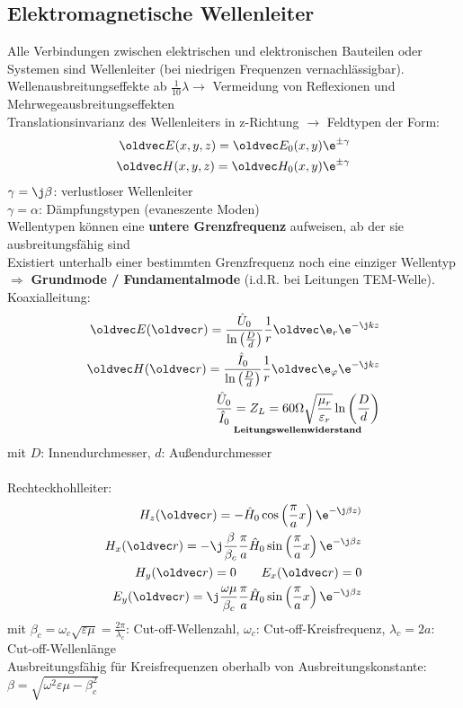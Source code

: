 \documentclass[6pt,a4paper]{scrartcl}
\let\vec\oldvec
\begin{document}
\begin{multicols}{4}
		\subsection{Elektromagnetische Wellenleiter}
	Alle Verbindungen zwischen elektrischen und elektronischen Bauteilen oder Systemen sind Wellenleiter (bei niedrigen Frequenzen vernachlässigbar).\\
	Wellenausbreitungseffekte ab $\frac{1}{10}\lambda \rightarrow$ Vermeidung von Reflexionen und Mehrwegeausbreitungseffekten\\
	Translationsinvarianz des Wellenleiters in z-Richtung $\rightarrow$ Feldtypen der Form:
	\begin{align*}
	 \vec E(x,y,z) = \vec E_0(x,y)\e^{\pm\gamma}\\
	 \vec H(x,y,z) = \vec H_0(x,y)\e^{\pm\gamma}
\end{align*}
	$\gamma = \j\beta$: verlustloser Wellenleiter\\
	$\gamma = \alpha$: Dämpfungstypen (evaneszente Moden)\\
	Wellentypen können eine \textbf{untere Grenzfrequenz} aufweisen, ab der sie ausbreitungsfähig sind\\
	Existiert unterhalb einer bestimmten Grenzfrequenz noch eine einziger Wellentyp $\Rightarrow$ \textbf{Grundmode / Fundamentalmode} (i.d.R. bei Leitungen TEM-Welle).\\
	Koaxialleitung:
	\begin{align*}
	\vec E(\vec r) = \frac{\hat U_0}{\ln\left(\frac{D}{d}\right)}\frac{1}{r}\vec\e_r\e^{-\j kz}\\
	\vec H(\vec r) = \frac{\hat I_0}{\ln\left(\frac{D}{d}\right)}\frac{1}{r}\vec\e_\varphi\e^{-\j kz}\\
	\underset{\textbf{Leitungswellenwiderstand}}{\frac{\hat U_0}{\hat I_0} = Z_L = 60\Omega\sqrt{\frac{\mu_r}{\varepsilon_r}}\ln\left(\frac{D}{d}\right)}
	\end{align*}
	mit $D$: Innendurchmesser, $d$: Außendurchmesser\\ \\
	
	Rechteckhohlleiter:
	\begin{align*}
	H_z(\vec r) = -\hat H_0\cos\left(\frac{\pi}{a}x\right)\e^{-\j\beta z)}\\
	H_x(\vec r) = -\j \frac{\beta}{\beta_c}\frac{\pi}{a}\hat H_0\sin\left(\frac{\pi}{a}x\right)\e^{-\j\beta z}\\
	H_y(\vec r) = 0\qquad E_x(\vec r) = 0\\	
	E_y(\vec r) = \j \frac{\omega\mu}{\beta_c}\frac{\pi}{a}\hat H_0\sin\left(\frac{\pi}{a}x\right)\e^{-\j\beta z}
	\end{align*}
	mit $\beta_c = \omega_c\sqrt{\varepsilon\mu} = \frac{2\pi}{\lambda_c}$: Cut-off-Wellenzahl, $\omega_c$: Cut-off-Kreisfrequenz, $\lambda_c = 2a$: Cut-off-Wellenlänge\\
	Ausbreitungsfähig für Kreisfrequenzen oberhalb von Ausbreitungskonstante: $\beta = \sqrt{\omega^2\varepsilon\mu-\beta_c^2}$
	

\end{multicols}
\end{document}
